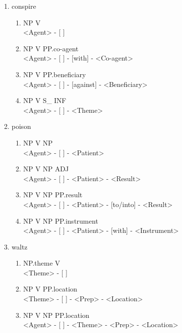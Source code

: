 \documentclass[11pt,a4paper,twocolumn]{article}
\begin{document}
		\begin{enumerate}
			\item conspire
				\begin{enumerate}
					\item NP V\\
					<Agent> - [ ]\\
					
					\item NP V PP.co-agent\\
					<Agent> - [ ] - [with] - <Co-agent>
					
					\item NP V PP.beneficiary\\
					<Agent> - [ ] - [against] - <Beneficiary>
					
					\item NP V S\_ INF\\
					<Agent> - [ ] - <Theme>
				\end{enumerate}
				
			\item poison
				\begin{enumerate}
					\item NP V NP\\
					<Agent> - [ ] - <Patient>
					
					\item NP V NP ADJ\\
					<Agent> - [ ] - <Patient> - <Result>
					
					\item NP V NP PP.result\\
					<Agent> - [ ] - <Patient> - [to/into] - <Result>
					
					\item NP V NP PP.instrument\\
					<Agent> - [ ] - <Patient> - [with] - <Instrument>
					
				\end{enumerate}
				
			\item waltz
				\begin{enumerate}
					\item NP.theme V\\
					<Theme> - [ ]
					
					\item NP V PP.location\\
					<Theme> - [ ] - <Prep> - <Location>
					
					\item NP V NP PP.location\\
					<Agent> - [ ] - <Theme> - <Prep> - <Location>
					

\end{enumerate}
\end{enumerate}
\end{document}
